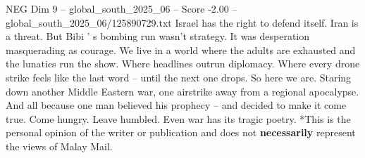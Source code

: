 \begin{textsample}{NEG Dim 9 – global\_south\_2025\_06 – Score -2.00 – global\_south\_2025\_06/125890729.txt}
Israel has the right to defend itself.
Iran is a threat.
But Bibi ' s bombing run wasn't strategy.
It was desperation masquerading as courage.
We live in a world where the adults are exhausted and the lunatics run the show.
Where headlines outrun diplomacy.
Where every drone strike feels like the last word -- until the next one drops.
So here we are.
Staring down another Middle Eastern war, one airstrike away from a regional apocalypse.
And all because one man believed his prophecy -- and decided to make it come true.
Come hungry.
Leave humbled.
Even war has its tragic poetry. *This is the personal opinion of the writer or publication and does not \textbf{necessarily} represent the views of Malay Mail.

\end{textsample}
